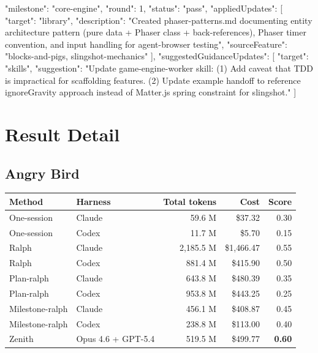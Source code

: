 \documentclass[11pt,a4paper]{article}
\newcommand{\code}[1]{#1}
\begin{document}
\begin{cbox}
{
  "milestone": "core-engine",
  "round": 1,
  "status": "pass",
  "appliedUpdates": [
    { "target": "library",
      "description": "Created phaser-patterns.md documenting entity architecture pattern (pure data + Phaser class + back-references), Phaser timer convention, and input handling for agent-browser testing",
      "sourceFeature": "blocks-and-pigs, slingshot-mechanics" }
  ],
  "suggestedGuidanceUpdates": [
    { "target": "skills",
      "suggestion": "Update game-engine-worker skill: (1) Add caveat that TDD is impractical for scaffolding features. (2) Update example handoff to reference ignoreGravity approach instead of Matter.js spring constraint for slingshot." }
  ]
}
\end{cbox}

\clearpage
\section{Result Detail}

\subsection*{Angry Bird}

\noindent\begin{tabular}{@{}llrrr@{}}
\toprule
\rowcolor{tablehead}\textbf{\color{white}Method} & \textbf{\color{white}Harness} & \textbf{\color{white}Total tokens} & \textbf{\color{white}Cost} & \textbf{\color{white}Score} \\
\midrule
\code{One-session}    & Claude              & 59.6 M    & \$37.32      & 0.30 \\
\rowcolor{tableband}
\code{One-session}    & Codex               & 11.7 M    & \$5.70       & 0.15 \\
\code{Ralph}          & Claude              & 2{,}185.5 M & \$1{,}466.47 & 0.55 \\
\rowcolor{tableband}
\code{Ralph}          & Codex               & 881.4 M   & \$415.90     & 0.50 \\
\code{Plan-ralph}     & Claude              & 643.8 M   & \$480.39     & 0.35 \\
\rowcolor{tableband}
\code{Plan-ralph}     & Codex               & 953.8 M   & \$443.25     & 0.25 \\
\code{Milestone-ralph}& Claude              & 456.1 M   & \$408.87     & 0.45 \\
\rowcolor{tableband}
\code{Milestone-ralph}& Codex               & 238.8 M   & \$113.00     & 0.40 \\
\code{Zenith}         & Opus 4.6 + GPT-5.4  & 519.5 M   & \$499.77     & \textbf{0.60} \\
\bottomrule
\end{tabular}
\end{document}

